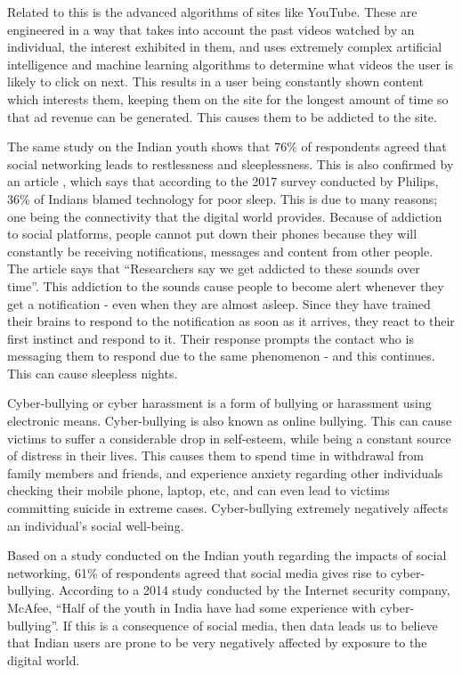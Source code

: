 \documentclass[a4paper, 11pt]{article}
\begin{document}
Related to this is the advanced algorithms of sites like YouTube. These are engineered in a way that takes into account the past videos watched by an individual, the interest exhibited in them, and uses extremely complex artificial intelligence and machine learning algorithms to determine  what videos the user is likely to click on next. This results in a user being constantly shown content which interests them, keeping them on the site for the longest amount of time so that ad revenue can be generated. This causes them to be addicted to the site.

The same study on the Indian youth shows that 76\% of respondents agreed that social networking leads to restlessness and sleeplessness. This is also confirmed by an article \cite{your-gadgets-are-robbing-you-of-your-sleep}, which says that according to the 2017 survey conducted by Philips, 36\% of Indians blamed technology for poor sleep. This is due to many reasons; one being the connectivity that the digital world provides. Because of addiction to social platforms, people cannot put down their phones because they will constantly be receiving notifications, messages and content from other people. The article says that “Researchers say we get addicted to these sounds over time”. This addiction to the sounds cause people to become alert whenever they get a notification - even when they are almost asleep. Since they have trained their brains to respond to the notification as soon as it arrives, they react to their first instinct and respond to it. Their response prompts the contact who is messaging them to respond due to the same phenomenon - and this continues. This can cause sleepless nights.

Cyber-bullying or cyber harassment is a form of bullying or harassment using electronic means. Cyber-bullying is also known as online bullying. This can cause victims to suffer a considerable drop in self-esteem, while being a constant source of distress in their lives. This causes them to spend time in withdrawal from family members and friends, and experience anxiety regarding other individuals checking their mobile phone, laptop, etc, and can even lead to victims committing suicide in extreme cases. Cyber-bullying extremely negatively affects an individual’s social well-being.

Based on a study conducted on the Indian youth regarding the impacts of social networking, 61\% of respondents agreed that social media gives rise to cyber-bullying. According to a 2014 study conducted by the Internet security company, McAfee, “Half of the youth in India have had some experience with cyber-bullying”. If this is a consequence of social media, then data leads us to believe that Indian users are prone to be very negatively affected by exposure to the digital world.
\end{document}
